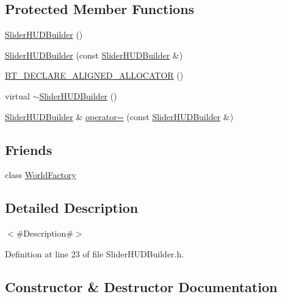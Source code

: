 \subsection*{Protected Member Functions}
\begin{DoxyCompactItemize}
\item 
\mbox{\hyperlink{classnjli_1_1_slider_h_u_d_builder_af73a377428f6af72564355d163b4dc16}{Slider\+H\+U\+D\+Builder}} ()
\item 
\mbox{\hyperlink{classnjli_1_1_slider_h_u_d_builder_a196d311ee0b48ddb8d3afdc096f5e392}{Slider\+H\+U\+D\+Builder}} (const \mbox{\hyperlink{classnjli_1_1_slider_h_u_d_builder}{Slider\+H\+U\+D\+Builder}} \&)
\item 
\mbox{\hyperlink{classnjli_1_1_slider_h_u_d_builder_afd9977bba090ace2dd35ea7fd0b8af19}{B\+T\+\_\+\+D\+E\+C\+L\+A\+R\+E\+\_\+\+A\+L\+I\+G\+N\+E\+D\+\_\+\+A\+L\+L\+O\+C\+A\+T\+OR}} ()
\item 
virtual \mbox{\hyperlink{classnjli_1_1_slider_h_u_d_builder_a15c750c346fe90e705427082213b7c68}{$\sim$\+Slider\+H\+U\+D\+Builder}} ()
\item 
\mbox{\hyperlink{classnjli_1_1_slider_h_u_d_builder}{Slider\+H\+U\+D\+Builder}} \& \mbox{\hyperlink{classnjli_1_1_slider_h_u_d_builder_a5e75bed3ec8b1934facaa3a9125e429c}{operator=}} (const \mbox{\hyperlink{classnjli_1_1_slider_h_u_d_builder}{Slider\+H\+U\+D\+Builder}} \&)
\end{DoxyCompactItemize}
\subsection*{Friends}
\begin{DoxyCompactItemize}
\item 
class \mbox{\hyperlink{classnjli_1_1_slider_h_u_d_builder_acb96ebb09abe8f2a37a915a842babfac}{World\+Factory}}
\end{DoxyCompactItemize}


\subsection{Detailed Description}
$<$\#\+Description\#$>$ 

Definition at line 23 of file Slider\+H\+U\+D\+Builder.\+h.



\subsection{Constructor \& Destructor Documentation}
\mbox{\label{classnjli_1_1_slider_h_u_d_builder_af73a377428f6af72564355d163b4dc16}} 
